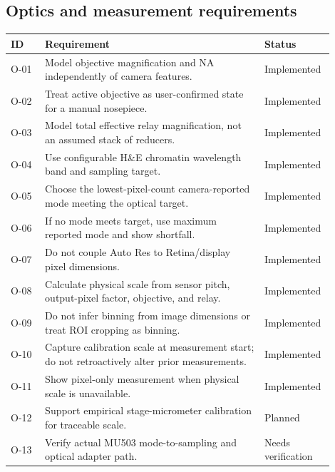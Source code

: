 \documentclass[11pt,a4paper,oneside]{article}
\newcommand{\implemented}{\textsf{Implemented}}
\newcommand{\planned}{\textsf{Planned}}
\newcommand{\verify}{\textsf{Needs verification}}
\begin{document}
\subsection{Optics and measurement requirements}
\begin{longtable}{p{0.10\linewidth}p{0.64\linewidth}p{0.16\linewidth}}
\toprule
ID & Requirement & Status\\
\midrule
O-01 & Model objective magnification and NA independently of camera features. & \implemented\\
O-02 & Treat active objective as user-confirmed state for a manual nosepiece. & \implemented\\
O-03 & Model total effective relay magnification, not an assumed stack of reducers. & \implemented\\
O-04 & Use configurable H\&E chromatin wavelength band and sampling target. & \implemented\\
O-05 & Choose the lowest-pixel-count camera-reported mode meeting the optical target. & \implemented\\
O-06 & If no mode meets target, use maximum reported mode and show shortfall. & \implemented\\
O-07 & Do not couple Auto Res to Retina/display pixel dimensions. & \implemented\\
O-08 & Calculate physical scale from sensor pitch, output-pixel factor, objective, and relay. & \implemented\\
O-09 & Do not infer binning from image dimensions or treat ROI cropping as binning. & \implemented\\
O-10 & Capture calibration scale at measurement start; do not retroactively alter prior measurements. & \implemented\\
O-11 & Show pixel-only measurement when physical scale is unavailable. & \implemented\\
O-12 & Support empirical stage-micrometer calibration for traceable scale. & \planned\\
O-13 & Verify actual MU503 mode-to-sampling and optical adapter path. & \verify\\
\bottomrule
\end{longtable}
\end{document}

